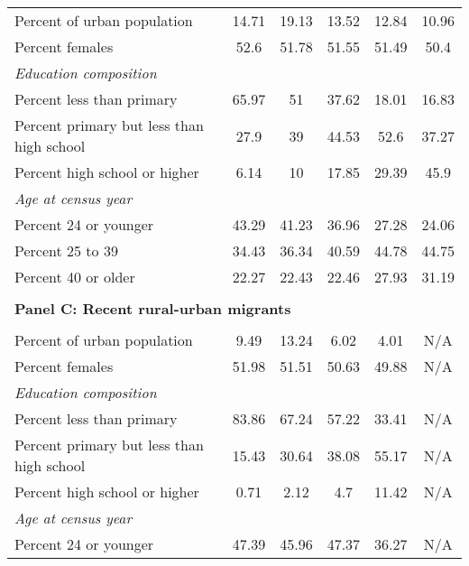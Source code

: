 \begin{tabular}{rccccc}
\multicolumn{1}{l}{    Percent of urban population} & 14.71 & 19.13 & 13.52 & 12.84 & 10.96 \\
\multicolumn{1}{l}{    Percent females} & 52.6  & 51.78 & 51.55 & 51.49 & 50.4 \\
\multicolumn{1}{l}{\textit{Education composition}} &       &       &       &       &  \\
\multicolumn{1}{l}{        Percent less than primary} & 65.97 & 51    & 37.62 & 18.01 & 16.83 \\
\multicolumn{1}{l}{        Percent primary but less than high school} & 27.9  & 39    & 44.53 & 52.6  & 37.27 \\
\multicolumn{1}{l}{        Percent high school or higher} & 6.14  & 10    & 17.85 & 29.39 & 45.9 \\
\multicolumn{1}{l}{\textit{Age at census year}} &       &       &       &       &  \\
\multicolumn{1}{l}{        Percent 24 or younger} & 43.29 & 41.23 & 36.96 & 27.28 & 24.06 \\
\multicolumn{1}{l}{        Percent 25 to 39} & 34.43 & 36.34 & 40.59 & 44.78 & 44.75 \\
\multicolumn{1}{l}{        Percent 40 or older} & 22.27 & 22.43 & 22.46 & 27.93 & 31.19 \\
      &       &       &       &       &  \\
\multicolumn{6}{l}{\textbf{Panel C: Recent rural-urban migrants}} \\
      &       &       &       &       &  \\
\multicolumn{1}{l}{    Percent of urban population} & 9.49  & 13.24 & 6.02  & 4.01  & N/A \\
\multicolumn{1}{l}{    Percent females} & 51.98 & 51.51 & 50.63 & 49.88 & N/A \\
\multicolumn{1}{l}{\textit{Education composition}} &       &       &       &       &  \\
\multicolumn{1}{l}{        Percent less than primary} & 83.86 & 67.24 & 57.22 & 33.41 & N/A \\
\multicolumn{1}{l}{        Percent primary but less than high school} & 15.43 & 30.64 & 38.08 & 55.17 & N/A \\
\multicolumn{1}{l}{        Percent high school or higher} & 0.71  & 2.12  & 4.7   & 11.42 & N/A \\
\multicolumn{1}{l}{\textit{Age at census year}} &       &       &       &       &  \\
\multicolumn{1}{l}{        Percent 24 or younger} & 47.39 & 45.96 & 47.37 & 36.27 & N/A \\

\end{tabular}

